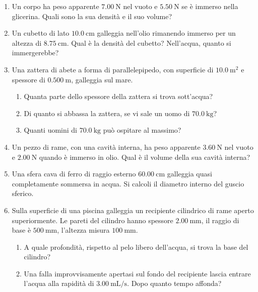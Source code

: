 \begin{enumerate}

    \item Un corpo ha peso apparente $\SI{7,00}{\newton}$ nel vuoto e $\SI{5,50}{\newton}$ se è immerso nella glicerina. Quali sono la sua densità e il suo volume?
    
    \item Un cubetto di lato  $\SI{10,0}{\cm}$ galleggia nell'olio rimanendo immerso per un altezza di $\SI{8,75}{\cm}$. Qual è la densità del cubetto? Nell'acqua, quanto si immergerebbe?

    \item Una zattera di abete a forma di parallelepipedo, con superficie di $\SI{10,0}{\meter^2}$ e spessore di $\SI{0,500}{\m}$, galleggia sul mare. 
    \begin{enumerate}
        \item Quanta parte dello spessore della zattera si trova sott'acqua?
        \item Di quanto si abbassa la zattera, se vi sale un uomo di $\SI{70,0}{\kg}$?
        \item Quanti uomini di $\SI{70,0}{\kg}$ può ospitare al massimo?
    \end{enumerate}
    
    \item Un pezzo di rame, con una cavità interna, ha peso apparente $\SI{3,60}{\newton}$ nel vuoto e $\SI{2,00}{\newton}$ quando è immerso in olio. Qual è il volume della sua cavità interna?

    \item Una sfera cava di ferro di raggio esterno $\SI{60,00}{\cm}$ galleggia quasi completamente sommersa in acqua. Si calcoli il diametro interno del guscio sferico.

    \item Sulla superficie di una piscina galleggia un recipiente cilindrico di rame aperto superiormente. Le pareti del cilindro hanno spessore $\SI{2,00}{\mm}$, il raggio di base è $\SI{500}{\mm}$, l'altezza misura  $\SI{100}{\mm}$.
    \begin{enumerate}
        \item A quale profondità, rispetto al pelo libero dell'acqua, si trova la base del cilindro?
        \item Una falla improvvisamente apertasi sul fondo del recipiente lascia entrare l'acqua alla rapidità di $\SI{3,00}{\milli\liter/\second}$. Dopo quanto tempo affonda?
    \end{enumerate}
    

\end{enumerate}
